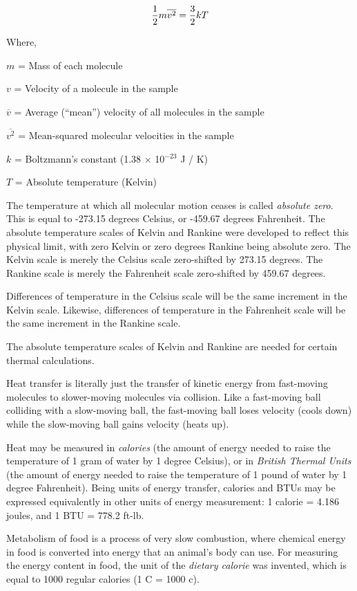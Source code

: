 $${1 \over 2}m\overline{v^2} = {3 \over 2}kT$$

\noindent
Where,

$m$ = Mass of each molecule

$v$ = Velocity of a molecule in the sample

$\overline{v}$ = Average (``mean'') velocity of all molecules in the sample

$\overline{v^2}$ = Mean-squared molecular velocities in the sample

$k$ = Boltzmann's constant (1.38 $\times$ 10$^{-23}$ J / K)

$T$ = Absolute temperature (Kelvin)

\vskip 10pt

The temperature at which all molecular motion ceases is called {\it absolute zero}.  This is equal to -273.15 degrees Celsius, or -459.67 degrees Fahrenheit.  The absolute temperature scales of Kelvin and Rankine were developed to reflect this physical limit, with zero Kelvin or zero degrees Rankine being absolute zero.  The Kelvin scale is merely the Celsius scale zero-shifted by 273.15 degrees.  The Rankine scale is merely the Fahrenheit scale zero-shifted by 459.67 degrees.

Differences of temperature in the Celsius scale will be the same increment in the Kelvin scale.  Likewise, differences of temperature in the Fahrenheit scale will be the same increment in the Rankine scale.

The absolute temperature scales of Kelvin and Rankine are needed for certain thermal calculations.

\vskip 10pt

Heat transfer is literally just the transfer of kinetic energy from fast-moving molecules to slower-moving molecules via collision.  Like a fast-moving ball colliding with a slow-moving ball, the fast-moving ball loses velocity (cools down) while the slow-moving ball gains velocity (heats up).

Heat may be measured in {\it calories} (the amount of energy needed to raise the temperature of 1 gram of water by 1 degree Celsius), or in {\it British Thermal Units} (the amount of energy needed to raise the temperature of 1 pound of water by 1 degree Fahrenheit).  Being units of energy transfer, calories and BTUs may be expressed equivalently in other units of energy measurement: 1 calorie = 4.186 joules, and 1 BTU = 778.2 ft-lb.

Metabolism of food is a process of very slow combustion, where chemical energy in food is converted into energy that an animal's body can use.  For measuring the energy content in food, the unit of the {\it dietary calorie} was invented, which is equal to 1000 regular calories (1 C = 1000 c).





